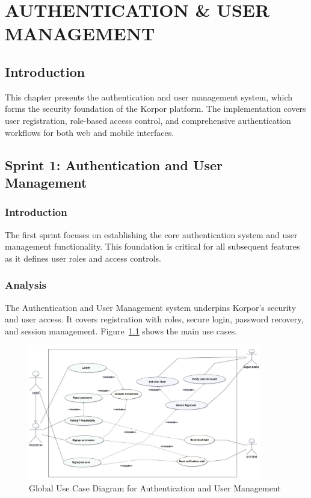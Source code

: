 \chapter{AUTHENTICATION \& USER MANAGEMENT}
\vspace{-0.5cm}
\section*{Introduction}
This chapter presents the authentication and user management system, which forms the security foundation of the Korpor platform. The implementation covers user registration, role-based access control, and comprehensive authentication workflows for both web and mobile interfaces.

 
\section{Sprint 1: Authentication and User Management}

\subsection*{Introduction}
The first sprint focuses on establishing the core authentication system and user management functionality. This foundation is critical for all subsequent features as it defines user roles and access controls.

\subsection{Analysis}
The Authentication and User Management system underpins Korpor's security and user access. It covers registration with roles, secure login, password recovery, and session management. Figure~\ref{fig:auth-usermgmt-usecase} shows the main use cases.
\newpage
\begin{figure}[htbp]
    \centering
    \includegraphics[width=0.9\textwidth]{images/auth-usermgmt-usecase.png} 
    \caption{Global Use Case Diagram for Authentication and User Management}
    \label{fig:auth-usermgmt-usecase}
\end{figure}



